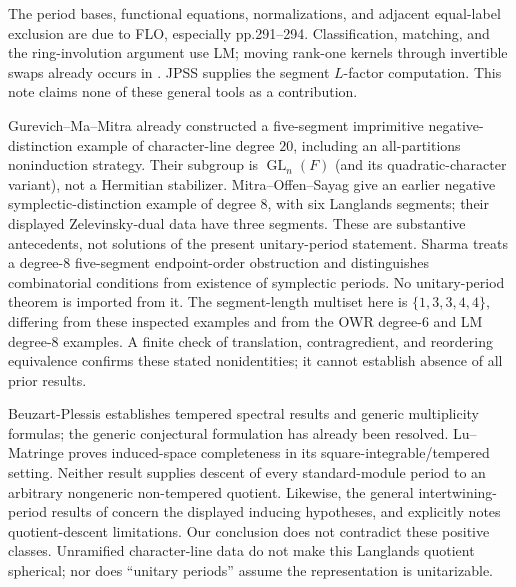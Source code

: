 \documentclass[11pt]{article}
\newcommand{\GL}{\operatorname{GL}}
\begin{document}
The period bases, functional equations, normalizations, and adjacent equal-label exclusion are due to FLO, especially pp.291--294. Classification, matching, and the ring-involution argument use LM; moving rank-one kernels through invertible swaps already occurs in \cite[\S6.4]{LM14}. JPSS supplies the segment $L$-factor computation. This note claims none of these general tools as a contribution.

Gurevich--Ma--Mitra \cite[\S8]{GMM} already constructed a five-segment imprimitive negative-distinction example of character-line degree $20$, including an all-partitions noninduction strategy. Their subgroup is $\GL_n(F)$ (and its quadratic-character variant), not a Hermitian stabilizer. Mitra--Offen--Sayag \cite[Example 9.4]{MOS} give an earlier negative symplectic-distinction example of degree $8$, with six Langlands segments; their displayed Zelevinsky-dual data have three segments. These are substantive antecedents, not solutions of the present unitary-period statement. Sharma \cite[Theorem 8.1, \S9]{Sharma} treats a degree-$8$ five-segment endpoint-order obstruction and distinguishes combinatorial conditions from existence of symplectic periods. No unitary-period theorem is imported from it. The segment-length multiset here is $\{1,3,3,4,4\}$, differing from these inspected examples and from the OWR degree-$6$ and LM degree-$8$ examples. A finite check of translation, contragredient, and reordering equivalence confirms these stated nonidentities; it cannot establish absence of all prior results.

Beuzart-Plessis \cite[Theorems 1--3]{BP} establishes tempered spectral results and generic multiplicity formulas; the generic conjectural formulation has already been resolved. Lu--Matringe \cite[\S5]{LuM} proves induced-space completeness in its square-integrable/tempered setting. Neither result supplies descent of every standard-module period to an arbitrary nongeneric non-tempered quotient. Likewise, the general intertwining-period results of \cite{MO,MOY} concern the displayed inducing hypotheses, and \cite{MO} explicitly notes quotient-descent limitations. Our conclusion does not contradict these positive classes. Unramified character-line data do not make this Langlands quotient spherical; nor does ``unitary periods'' assume the representation is unitarizable.
\end{document}
